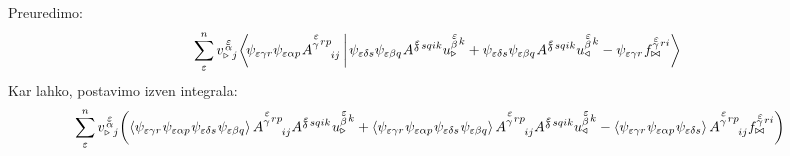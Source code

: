 Preuredimo:
\begin{equation*}
   \sum^n_\varepsilon
   v^{\mkern 2mu \substack{\varepsilon \\[-0.63mm] \alpha \\[-0.2mm]}}_{\triangleright \mkern5mu j} \mkern-2mu
   \braket{
      \mkern-4mu \psi_{ \varepsilon \gamma r}     \psi_{\varepsilon \alpha p} \mkern1mu
      A^{\substack{\mkern2mu \varepsilon \\[0.12mm] \gamma} \mkern2mu r p}_{\mkern29mu i j}  \mkern3mu }
   {
      \mkern2mu \psi_{\varepsilon \delta s}     \psi_{\varepsilon \beta q} \mkern1mu
      A^{\substack{\mkern2mu \varepsilon \\[-0.59mm] \delta} \mkern2mu s q i k}
      u^{\substack{\mkern2mu \varepsilon \\[0.09mm] \beta} \mkern2mu k}_\triangleright
      +
      \psi_{\varepsilon \delta s}     \psi_{\varepsilon \beta q} \mkern1mu
      A^{\substack{\mkern2mu \varepsilon \\[-0.59mm] \delta} \mkern2mu s q i k}
      u^{\substack{\mkern2mu \varepsilon \\[0.09mm] \beta} \mkern2mu k}_\triangleleft
      -
      \psi_{\varepsilon \gamma r} \mkern1mu
      f^{\substack{\mkern2mu \varepsilon \\[-0.59mm] \gamma} \mkern2mu r i}_{\bowtie} }
\end{equation*}
Kar lahko, postavimo izven integrala:
\begin{equation*}
   \mkern-20mu \sum^n_\varepsilon   v^{\mkern 2mu \substack{\varepsilon \\[-0.5mm] \alpha \\[-0.2mm]}}_{\triangleright \mkern5mu j}
   \qty( \expval{
      \psi_{ \varepsilon \gamma r} \mkern1mu
      \psi_{\varepsilon \alpha p} \mkern1mu
      \psi_{\varepsilon \delta s} \mkern1mu
      \psi_{\varepsilon \beta q} }
   A^{\substack{\mkern2mu \varepsilon \\[0.12mm] \gamma} \mkern2mu r p}_{\mkern29mu i j}
   A^{\substack{\mkern2mu \varepsilon \\[-0.59mm] \delta} \mkern2mu s q i k} \mkern1mu
   u^{\substack{\mkern2mu \varepsilon \\[0.14mm] \beta} \mkern2mu k}_\triangleright
   +
   \expval{
      \psi_{ \varepsilon \gamma r} \mkern1mu
      \psi_{\varepsilon \alpha p} \mkern1mu
      \psi_{\varepsilon \delta s} \mkern1mu
      \psi_{\varepsilon \beta q} }
   A^{\substack{\mkern2mu \varepsilon \\[0.12mm] \gamma} \mkern2mu r p}_{\mkern29mu i j}
   A^{\substack{\mkern2mu \varepsilon \\[-0.59mm] \delta} \mkern2mu s q i k}
   u^{\substack{\mkern2mu \varepsilon \\[0.14mm] \beta} \mkern2mu k}_\triangleleft
   -
   \expval{
      \psi_{ \varepsilon \gamma r} \mkern1mu
      \psi_{\varepsilon \alpha p} \mkern1mu
      \psi_{\varepsilon \delta s} }
   A^{\substack{\mkern2mu \varepsilon \\[0.12mm] \gamma} \mkern2mu r p}_{\mkern29mu i j}
   f^{\substack{\mkern2mu \varepsilon \\[-0.59mm] \gamma} \mkern2mu r i}_{\bowtie} )
\end{equation*}
